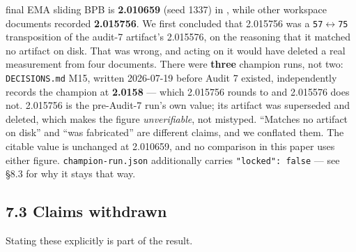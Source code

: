\begin{itemize}
  final EMA sliding BPB is \textbf{2.010659} (seed 1337) in , while other
  workspace documents recorded \textbf{2.015756}. We first concluded that 2.015756 was a \texttt{57}$\leftrightarrow$\texttt{75}
  transposition of the audit-7 artifact's 2.015576, on the reasoning that it matched no artifact
  on disk. That was wrong, and acting on it would have deleted a real measurement from four
  documents. There were \textbf{three} champion runs, not two: \texttt{DECISIONS.md} M15, written 2026-07-19
  before Audit 7 existed, independently records the champion at \textbf{2.0158} --- which 2.015756 rounds
  to and 2.015576 does not. 2.015756 is the pre-Audit-7 run's own value; its artifact was
  superseded and deleted, which makes the figure \emph{unverifiable}, not mistyped. ``Matches no
  artifact on disk'' and ``was fabricated'' are different claims, and we conflated them. The citable
  value is unchanged at 2.010659, and no comparison in this paper uses either figure.
  \texttt{champion-run.json} additionally carries \texttt{"locked":\ false} --- see \S8.3 for why it stays that way.
\end{itemize}

\subsection{7.3 Claims withdrawn}\label{claims-withdrawn}

Stating these explicitly is part of the result.

